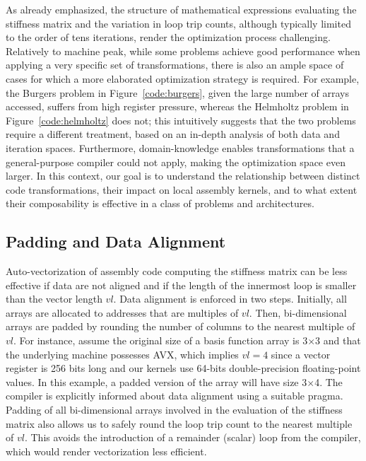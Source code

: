 \documentclass[conference]{IEEEtran}
\begin{document}
As already emphasized, the structure of mathematical expressions evaluating the stiffness matrix and the variation in loop trip counts, although typically limited to the order of tens iterations, render the optimization process challenging. Relatively to machine peak, while some problems achieve good performance when applying a very specific set of transformations, there is also an ample space of cases for which a more elaborated optimization strategy is required. For example, the Burgers problem in Figure~\ref{code:burgers}, given the large number of arrays accessed, suffers from high register pressure, whereas the Helmholtz problem in Figure~\ref{code:helmholtz} does not; this intuitively suggests that the two problems require a different treatment, based on an in-depth analysis of both data and iteration spaces. Furthermore, domain-knowledge enables transformations that a general-purpose compiler could not apply, making the optimization space even larger. In this context, our goal is to understand the relationship between distinct code transformations, their impact on local assembly kernels, and to what extent their composability is effective in a class of problems and architectures.


\subsection{Padding and Data Alignment}
Auto-vectorization of assembly code computing the stiffness matrix can be less effective if data are not aligned and if the length of the innermost loop is smaller than the vector length $vl$. Data alignment is enforced in two steps. Initially, all arrays are allocated to addresses that are multiples of $vl$. Then, bi-dimensional arrays are padded by rounding the number of columns to the nearest multiple of $vl$. For instance, assume the original size of a basis function array is 3$\times$3 and that the underlying machine possesses AVX, which implies $vl=4$ since a vector register is 256 bits long and our kernels use 64-bits double-precision floating-point values. In this example, a padded version of the array will have size 3$\times$4. The compiler is explicitly informed about data alignment using a suitable pragma. Padding of all bi-dimensional arrays involved in the evaluation of the stiffness matrix also allows us to safely round the loop trip count to the nearest multiple of $vl$. This avoids the introduction of a remainder (scalar) loop from the compiler, which would render vectorization less efficient.
\end{document}
